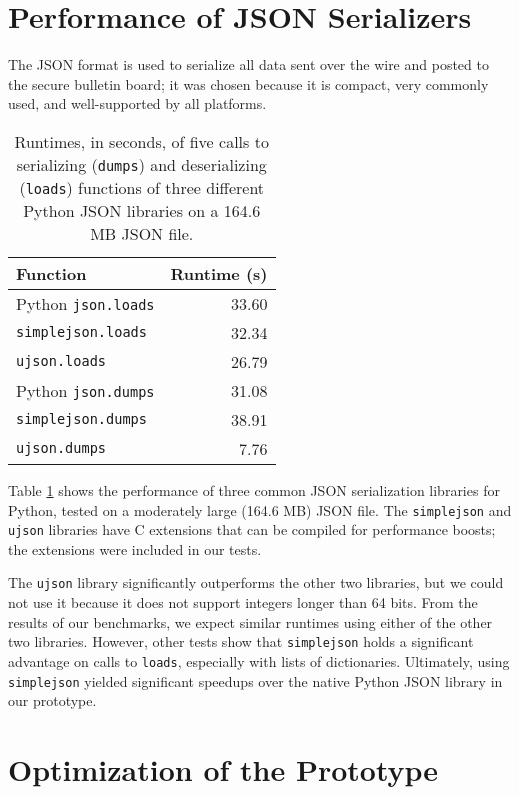 \section{Performance of JSON Serializers} \label{perf:json}

The JSON format is used to serialize all data sent over the wire and posted to the secure bulletin board; it was chosen because it is compact, very commonly used, and well-supported by all platforms.

\begin{table}[htbp]
\centering
\begin{tabular}{l | r}
  \textbf{Function} & \textbf{Runtime (s)} \\
  \hline
  Python \texttt{json.loads} & 33.60 \\
  \texttt{simplejson.loads} & 32.34 \\
  \texttt{ujson.loads} & 26.79 \\
  \hline
  Python \texttt{json.dumps} & 31.08 \\
  \texttt{simplejson.dumps} & 38.91 \\
  \texttt{ujson.dumps} & 7.76
\end{tabular}
\caption[Performance measurements of JSON serializers]{Runtimes, in seconds, of five calls to serializing (\texttt{dumps}) and deserializing (\texttt{loads}) functions of three different Python JSON libraries on a 164.6 MB JSON file.}
\label{table:perf:json}
\end{table}

Table \ref{table:perf:json} shows the performance of three common JSON serialization libraries for Python, tested on a moderately large (164.6 MB) JSON file. The \texttt{simplejson} and \texttt{ujson} libraries have C extensions that can be compiled for performance boosts; the extensions were included in our tests.

The \texttt{ujson} library significantly outperforms the other two libraries, but we could not use it because it does not support integers longer than 64 bits. From the results of our benchmarks, we expect similar runtimes using either of the other two libraries. However, other tests \cite{json-bench} show that \texttt{simplejson} holds a significant advantage on calls to \texttt{loads}, especially with lists of dictionaries. Ultimately, using \texttt{simplejson} yielded significant speedups over the native Python JSON library in our prototype.

\section{Optimization of the Prototype} \label{perf:optimizations}

